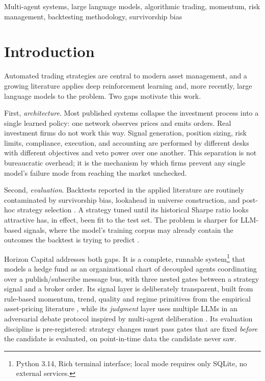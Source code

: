 \documentclass[10pt,twocolumn]{IEEEtran}
\begin{document}
\begin{IEEEkeywords}
Multi-agent systems, large language models, algorithmic trading, momentum,
risk management, backtesting methodology, survivorship bias
\end{IEEEkeywords}

\section{Introduction}

Automated trading strategies are central to modern asset management, and a
growing literature applies deep reinforcement learning
\cite{yang2020ensemble,xiong2018practical,jiang2017deep,liu2020finrl} and, more
recently, large language models
\cite{yang2023fingpt,wu2023bloomberggpt,xiao2024tradingagents,yu2023finmem} to
the problem. Two gaps motivate this work.

First, \emph{architecture}. Most published systems collapse the investment
process into a single learned policy: one network observes prices and emits
orders. Real investment firms do not work this way. Signal generation,
position sizing, risk limits, compliance, execution, and accounting are
performed by different desks with different objectives and veto power over
one another. This separation is not bureaucratic overhead; it is the
mechanism by which firms prevent any single model's failure mode from
reaching the market unchecked.

Second, \emph{evaluation}. Backtests reported in the applied literature are
routinely contaminated by survivorship bias, lookahead in universe
construction, and post-hoc strategy selection \cite{bailey2014deflated,
lopezdeprado2018advances,harvey2016cross}. A strategy tuned until its
historical Sharpe ratio looks attractive has, in effect, been fit to the test
set. The problem is sharper for LLM-based signals, where the model's training
corpus may already contain the outcomes the backtest is trying to predict
\cite{glasserman2023lookahead}.

Horizon Capital addresses both gaps. It is a complete, runnable
system\footnote{Python 3.14, Rich terminal interface; local mode requires
only SQLite, no external services.} that models a hedge fund as an
organizational chart of decoupled agents coordinating over a
publish/subscribe message bus, with three nested gates between a strategy
signal and a broker order. Its signal layer is deliberately transparent,
built from rule-based momentum, trend, quality and regime primitives from the
empirical asset-pricing literature \cite{jegadeesh1993returns,faber2007tactical,
asness2019qmj}, while its \emph{judgment} layer uses multiple LLMs in an
adversarial debate protocol inspired by multi-agent deliberation
\cite{du2023improving,park2023generative}. Its evaluation discipline is
pre-registered: strategy changes must pass gates that are fixed \emph{before}
the candidate is evaluated, on point-in-time data the candidate never saw.
\end{document}

